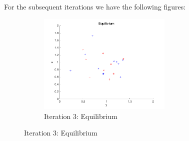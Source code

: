 For the subsequent iterations we have the following figures:
\begin{figure}[H]
\begin{subfigure}[b]{0.45\textwidth}
\begin{center}
\includegraphics[width=0.7\textwidth]{img/mdme/equilibrium3}
\caption{Iteration 3: Equilibrium}
\end{center}
\end{subfigure}


\end{figure}
